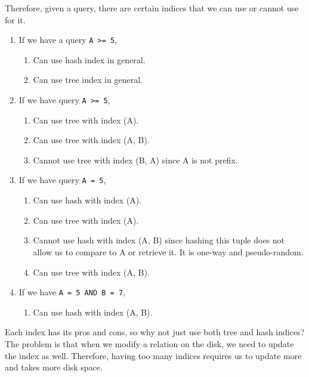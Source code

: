 \documentclass{article}
\begin{document}
    \begin{example}
      Therefore, given a query, there are certain indices that we can use or cannot use for it.
      \begin{enumerate}
        \item If we have a query \texttt{A >= 5}, 
          \begin{enumerate}
            \item Can use hash index in general.  
            \item Can use tree index in general. 
          \end{enumerate}

        \item If we have query \texttt{A >= 5}, 
          \begin{enumerate}
            \item Can use tree with index (A). 
            \item Can use tree with index (A, B). 
            \item Cannot use tree with index (B, A) since A is not prefix. 
          \end{enumerate}

        \item If we have query \texttt{A = 5},
          \begin{enumerate}
            \item Can use hash with index (A). 
            \item Can use tree with index (A). 
            \item Cannot use hash with index (A, B) since hashing this tuple does not allow us to compare to A or retrieve it. It is one-way and pseudo-random.   
            \item Can use tree with index (A, B). 
          \end{enumerate}

        \item If we have \texttt{A = 5 AND B = 7}, 
          \begin{enumerate}
            \item Can use hash with index (A, B). 
          \end{enumerate}
      \end{enumerate}
    \end{example}

    Each index has its pros and cons, so why not just use both tree and hash indices? The problem is that when we modify a relation on the disk, we need to update the index as well. Therefore, having too many indices requires us to update more and takes more disk space. 
\end{document}
